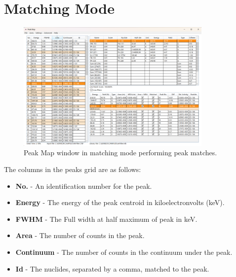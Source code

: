 \documentclass[12pt,report,justified]{SANDreport}
\begin{document}
\section{Matching Mode}\label{sec:match_mode}
\begin{figure}[h]
    \includegraphics[width=0.85\textwidth]{MainWindow.png}
    \centering
    \caption{Peak Map window in matching mode performing peak matches.}
   \label{fig:main_window}
\end{figure}

The columns in the peaks grid are as follows:
\begin{itemize}
    \item \textbf{No.} - An identification number for the peak.
    \item \textbf{Energy} - The energy of the peak centroid in kiloelectronvolts (keV).
    \item \textbf{FWHM} - The Full width at half maximum of peak in keV.
    \item \textbf{Area} - The number of counts in the peak.
    \item \textbf{Continuum} - The number of counts in the continuum under the peak.
    \item \textbf{Id} - The nuclides, separated by a comma, matched to the peak.
\end{itemize}
\end{document}
